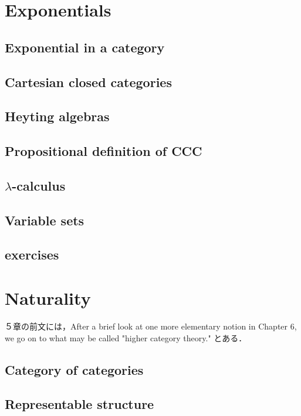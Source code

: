 \documentclass[uplatex, 12pt, dvipdfmx]{jsarticle}
\begin{document}
\section{Exponentials}

\subsection{Exponential in a category}

\subsection{Cartesian closed categories}

\subsection{Heyting algebras}

\subsection{Propositional definition of CCC}

\subsection{$\lambda$-calculus}

\subsection{Variable sets}

\subsection{exercises}

\section{Naturality}
５章の前文には，After a brief look at one more elementary notion in Chapter 6, we go on to what may be called "higher category theory." とある．

\subsection{Category of categories}

\subsection{Representable structure}
\end{document}
